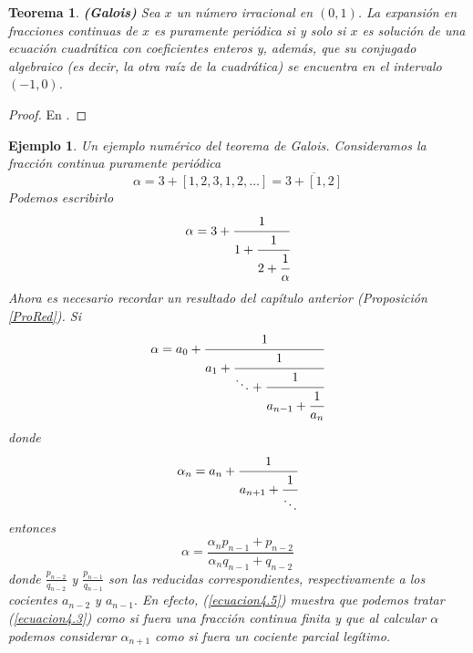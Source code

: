 \documentclass[12pt]{report}
\newtheorem{teo}{Teorema}[section]
\newtheorem{ejem}{Ejemplo}[section]
\begin{document}
\begin{teo}
\textbf{(Galois)} Sea $x$ un número irracional en $(0,1)$. La expansión en fracciones continuas de $x$ es puramente periódica si y solo si $x$ es solución de una ecuación cuadrática con coeficientes enteros y, además, que su conjugado algebraico (es decir, la otra raíz de la cuadrática) se encuentra en el intervalo $(-1, 0)$.
\label{Galois}
\end{teo}
\begin{proof}
En \cite{Olds}.
\end{proof}
\begin{ejem}
Un ejemplo numérico del teorema de Galois. Consideramos la fracción continua puramente periódica
    $$
    \alpha = 3+[1,2,3,1,2,\ldots]=\overline{3+[1,2]}
    $$
    Podemos escribirlo
    \begin{equation}
        \alpha=3+\cfrac{1}{1+\cfrac{1}{2+\cfrac{1}{\alpha}}}
        \label{ecuacion4.2}
    \end{equation}
    Ahora es necesario recordar un resultado del capítulo anterior (Proposición \ref{ProRed}). Si
    \begin{equation}
        \alpha = a_{0}+\cfrac{1}{a_{1}+\cfrac{1}{\ddots+\cfrac{1}{a_{n-1}+\cfrac{1}{a_{n}}}}}
        \label{ecuacion4.3}
    \end{equation}
    donde
    \begin{equation}
        \alpha_{n} = a_{n} + \cfrac{1}{a_{n+1}+\cfrac{1}{\ddots}}
        \label{ecuacion4.4}
    \end{equation}
    entonces
    \begin{equation}
        \alpha = \frac{\alpha_{n}p_{n-1}+p_{n-2}}{\alpha_{n}q_{n-1}+q_{n-2}}
        \label{ecuacion4.5}
    \end{equation}
    donde $\frac{p_{n-2}}{q_{n-2}}$ y $\frac{p_{n-1}}{q_{n-1}}$ son las reducidas correspondientes, respectivamente a los cocientes $a_{n-2}$ y $a_{n-1}.$ En efecto, (\ref{ecuacion4.5}) muestra que podemos tratar (\ref{ecuacion4.3}) como si fuera una fracción continua finita y que al calcular $\alpha$ podemos considerar $\alpha_{n + 1}$ como si fuera un cociente parcial legítimo.
    

\end{ejem}
\end{document}
